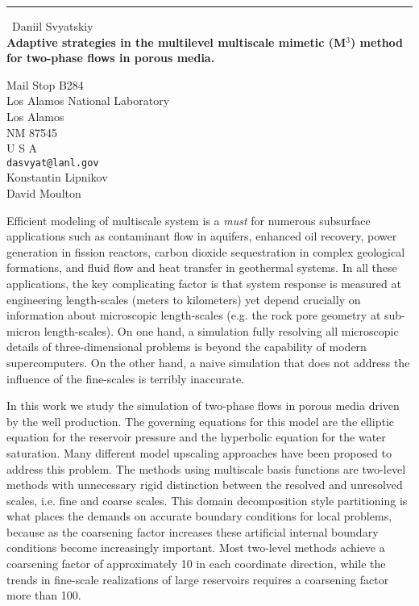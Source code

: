 \documentclass{report}
\begin{document}
\begin{center}
\rule{6in}{1pt} \
{\large Daniil Svyatskiy \\
{\bf Adaptive strategies in the multilevel multiscale mimetic (M$^3$) method for two-phase flows in porous media.}}

Mail Stop B284 \\ Los Alamos National Laboratory \\ Los Alamos \\ NM 87545 \\ U S A
\\
{\tt dasvyat@lanl.gov}\\
Konstantin Lipnikov\\
David Moulton\end{center}

Efficient modeling of multiscale system is a {\it must} for numerous subsurface
applications such as contaminant flow in aquifers, enhanced oil recovery, power
generation in fission reactors, carbon dioxide sequestration in complex geological
formations, and fluid flow and heat transfer in geothermal systems.
In all these applications, the key complicating factor is that system
response is measured at engineering length-scales (meters to kilometers) yet depend
crucially on information about microscopic length-scales (e.g. the rock pore geometry
at sub-micron length-scales). On one hand, a simulation fully resolving all microscopic
details of three-dimensional problems is beyond the capability of modern
supercomputers. On the other hand, a naive simulation that does not address the
influence of the fine-scales is terribly inaccurate.

In this work we study the simulation of two-phase flows in porous media
driven by the well production.
The governing equations for this model are
the elliptic equation for the reservoir pressure and the hyperbolic equation for
the water saturation. Many different model upscaling approaches have been
proposed to address this problem.
The methods using multiscale basis functions are two-level methods with unnecessary
rigid distinction between the resolved and unresolved scales, i.e. fine and coarse
scales. This domain decomposition style partitioning is what places the demands
on accurate boundary conditions for local problems, because as the coarsening factor
increases these artificial internal boundary conditions become increasingly important.
Most two-level methods achieve a coarsening factor of approximately
10 in each coordinate direction, while the trends in fine-scale realizations of
large reservoirs requires a coarsening factor more than 100.
\end{document}
